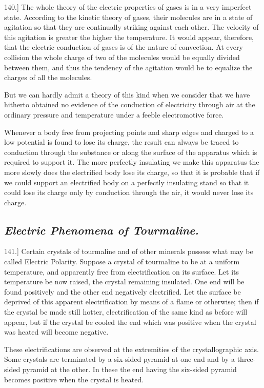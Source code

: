 \documentclass[12pt,oneside]{book}[2021/10/04]
\newcommand{\Heading}{\centering\normalfont}
\newcommand{\Subsection}[1]{\subsection*{\normalsize\Heading\itshape #1}}
\newcommand{\article}[1]{\phantomsection \label{art:#1}{#1.]}}
\newcommand{\¬}{\hphantom{0}}
\begin{document}
\article{140} The whole theory of the electric properties of gases is in a
very imperfect state. According to the kinetic theory of gases,
their molecules are in a state of agitation so that they are continually
striking against each other. The velocity of this agitation
is greater the higher the temperature. It would appear, therefore,
that the electric conduction of gases is of the nature of convection.
At every collision the whole charge of two of the molecules would
be equally divided between them, and thus the tendency of the
agitation would be to equalize the charges of all the molecules.

But we can hardly admit a theory of this kind when we consider
that we have hitherto obtained no evidence of the conduction of
electricity through air at the ordinary pressure and temperature
under a feeble electromotive force.

Whenever a body free from projecting points and sharp edges
and charged to a low potential is found to lose its charge, the
result can always be traced to conduction through the substance
or along the surface of the apparatus which is required to support
it. The more perfectly insulating we make this apparatus the
more slowly does the electrified body lose its charge, so that it
is probable that if we could support an electrified body on a perfectly
insulating stand so that it could lose its charge only by
conduction through the air, it would never lose its charge.

\Subsection{Electric Phenomena of Tourmaline.}

\article{141} Certain crystals of tourmaline and of other minerals
possess what may be called Electric Polarity. Suppose a crystal
of tourmaline to be at a uniform temperature, and apparently
free from electrification on its surface. Let its temperature be
now raised, the crystal remaining insulated. One end will be
found positively and the other end negatively electrified. Let the
surface be deprived of this apparent electrification by means of a
flame or otherwise; then if the crystal be made still hotter, electrification
of the same kind as before will appear, but if the crystal be
cooled the end which was positive when the crystal was heated will
become negative.

These electrifications are observed at the extremities of the crystallographic
axis. Some crystals are terminated by a six-sided
pyramid at one end and by a three-sided pyramid at the other.
In these the end having the six-sided pyramid becomes positive
when the crystal is heated.
\end{document}
